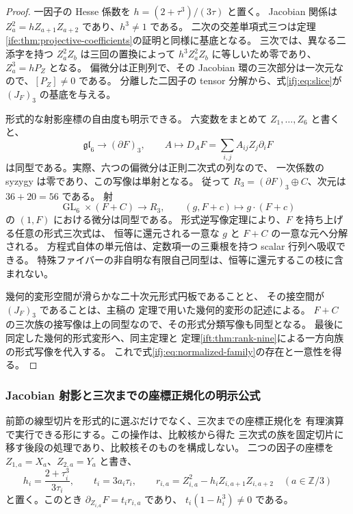 \begin{proof}
一因子の Hesse 係数を $h=(2+\tau^3)/(3\tau)$ と置く。
Jacobian 関係は $Z_a^2=hZ_{a+1}Z_{a+2}$ であり、$h^3\ne1$ である。
二次の交差単項式三つは定理\ref{ife:thm:projective-coefficients}の証明と同様に基底となる。
三次では、異なる二添字を持つ $Z_a^2Z_b$ は三回の置換によって
$h^3Z_a^2Z_b$ に等しいため零であり、$Z_a^3=hP_Z$ となる。
偏微分は正則列で、その Jacobian 環の三次部分は一次元なので、$[P_Z]\ne0$ である。
分離した二因子の tensor 分解から、式\eqref{ifj:eq:slice}が $(J_F)_3$ の基底を与える。

形式的な射影座標の自由度も明示できる。
六変数をまとめて $Z_1,\ldots,Z_6$ と書くと、
\[
 \mathfrak{gl}_6\longrightarrow (\partial F)_3,
 \qquad A\longmapsto D_AF=\sum_{i,j}A_{ij}Z_j\partial_iF
\]
は同型である。実際、六つの偏微分は正則二次式の列なので、
一次係数の syzygy は零であり、この写像は単射となる。
従って $R_3=(\partial F)_3\oplus C$、次元は $36+20=56$ である。
射
\[
       \operatorname{GL}_6\times(F+C)\longrightarrow R_3,
                   \qquad(g,F+c)\longmapsto g\cdot(F+c)
\]
の $(1,F)$ における微分は同型である。
形式逆写像定理により、$F$ を持ち上げる任意の形式三次式は、
恒等に還元される一意な $g$ と $F+C$ の一意な元へ分解される。
方程式自体の単元倍は、定数項一の三乗根を持つ scalar 行列へ吸収できる。
特殊ファイバーの非自明な有限自己同型は、恒等に還元するこの枝に含まれない。

幾何的変形空間が滑らかな二十次元形式円板であることと、
その接空間が $(J_F)_3$ であることは、主稿の
定理で用いた幾何的変形の記述による。
$F+C$ の三次族の接写像は上の同型なので、その形式分類写像も同型となる。
最後に同定した幾何的形式変形へ、同主定理と
定理\ref{ift:thm:rank-nine}による一方向族の形式写像を代入する。
これで式\eqref{ifj:eq:normalized-family}の存在と一意性を得る。
\end{proof}

\subsubsection{Jacobian 射影と三次までの座標正規化の明示公式}

前節の線型切片を形式的に選ぶだけでなく、三次までの座標正規化を
有理演算で実行できる形にする。この操作は、比較核から得た
三次式の族を固定切片に移す後段の処理であり、比較核そのものを構成しない。
二つの因子の座標を $Z_{1,a}=X_a$、$Z_{2,a}=Y_a$ と書き、
\[
 h_i=\frac{2+\tau_i^3}{3\tau_i},\qquad
 t_i=3a_i\tau_i,\qquad
 r_{i,a}=Z_{i,a}^2-h_iZ_{i,a+1}Z_{i,a+2}
 \quad(a\in\mathbb Z/3)
\]
と置く。このとき $\partial_{Z_{i,a}}F=t_ir_{i,a}$ であり、
$t_i(1-h_i^3)\ne0$ である。

